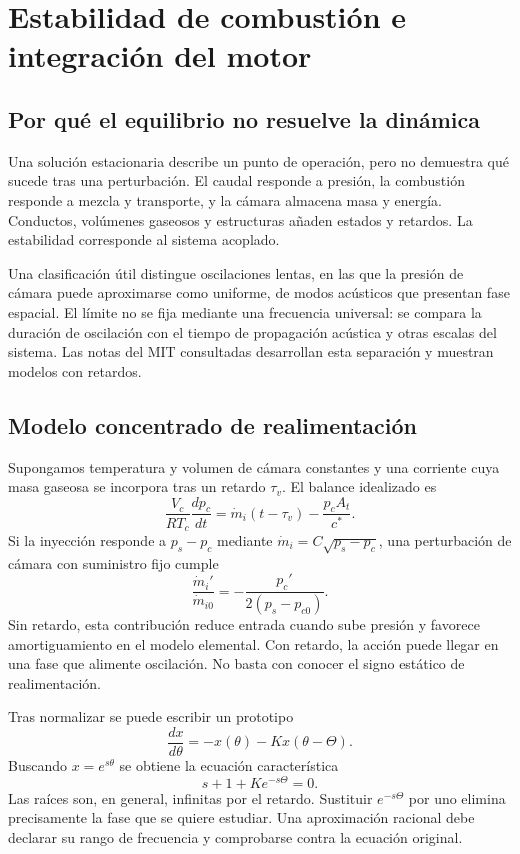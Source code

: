 \chapter{Estabilidad de combustión e integración del motor}\label{ch:20}
\section{Por qué el equilibrio no resuelve la dinámica}
Una solución estacionaria describe un punto de operación, pero no demuestra qué sucede tras una perturbación. El caudal responde a presión, la combustión responde a mezcla y transporte, y la cámara almacena masa y energía. Conductos, volúmenes gaseosos y estructuras añaden estados y retardos. La estabilidad corresponde al sistema acoplado.

Una clasificación útil distingue oscilaciones lentas, en las que la presión de cámara puede aproximarse como uniforme, de modos acústicos que presentan fase espacial. El límite no se fija mediante una frecuencia universal: se compara la duración de oscilación con el tiempo de propagación acústica y otras escalas del sistema. Las notas del MIT consultadas desarrollan esta separación y muestran modelos con retardos.\cite{MIT22,MIT23}
\section{Modelo concentrado de realimentación}
Supongamos temperatura y volumen de cámara constantes y una corriente cuya masa gaseosa se incorpora tras un retardo $\tau_v$. El balance idealizado es
\[
 \frac{V_c}{RT_c}\frac{dp_c}{dt}
 =\dot m_i(t-\tau_v)-\frac{p_cA_t}{c^*}.
\]
Si la inyección responde a $p_s-p_c$ mediante $\dot m_i=C\sqrt{p_s-p_c}$, una perturbación de cámara con suministro fijo cumple
\[
 \frac{\dot m_i'}{\dot m_{i0}}=-\frac{p_c'}{2(p_s-p_{c0})}.
\]
Sin retardo, esta contribución reduce entrada cuando sube presión y favorece amortiguamiento en el modelo elemental. Con retardo, la acción puede llegar en una fase que alimente oscilación. No basta con conocer el signo estático de realimentación.

Tras normalizar se puede escribir un prototipo
\[
 \frac{dx}{d\theta}=-x(\theta)-Kx(\theta-\Theta).
\]
Buscando $x=e^{s\theta}$ se obtiene la ecuación característica
\begin{equation}
 s+1+Ke^{-s\Theta}=0.
\end{equation}
Las raíces son, en general, infinitas por el retardo. Sustituir $e^{-s\Theta}$ por uno elimina precisamente la fase que se quiere estudiar. Una aproximación racional debe declarar su rango de frecuencia y comprobarse contra la ecuación original.
